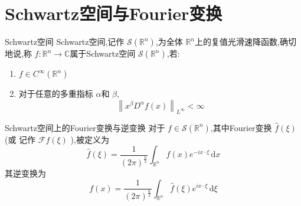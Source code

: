 \documentclass[../../main.tex]{subfiles}
\begin{document}
\section{Schwartz空间与Fourier变换}
\begin{definition}{Schwartz空间}
    Schwartz空间,记作 \(  \mathcal{S}\left( \mathbb{R} ^{n} \right)   \),为全体 \(  \mathbb{R} ^{n}  \)上的复值光滑速降函数,确切地说,称 \(  f:\mathbb{R} ^{n}\to \mathbb{C}   \)属于Schwartz空间 \(  \mathcal{S}\left( \mathbb{R} ^{n} \right)   \),若:
    \begin{enumerate}
        \item  \(  f \in C^{\infty}\left( \mathbb{R} ^{n} \right)   \)
        \item 对于任意的多重指标 \(  \alpha   \)和 \(  \beta   \), \[
        \left\| x^{\beta }D^{\alpha }f\left( x \right)  \right\|_{L^{\infty}}<\infty
        \]   
    \end{enumerate}
        
\end{definition}

\begin{definition}{Schwartz空间上的Fourier变换与逆变换}
    对于 \(  f \in \mathcal{S}\left( \mathbb{R} ^{n} \right)   \),其中Fourier变换 \(  \hat{f}\left(  \xi  \right)   \)(或 记作 \(  \mathcal{F}f\left(  \xi  \right)   \) ),被定义为 \[
    \hat{f}\left(  \xi  \right)=\frac{1 }{\left( 2\pi  \right)^{\frac{n }{2 } }  }  \int_{\mathbb{R} ^{n}}f\left( x \right)e^{- ix\cdot  \xi } \,\mathrm{d} x 
    \]  其逆变换为 \[
    f\left( x \right)= \frac{1 }{\left( 2\pi  \right)^{\frac{n }{2 } }  } \int_{\mathbb{R} ^{n}} \hat{f}\left(  \xi  \right)e^{ ix\cdot  \xi }\,\mathrm{d}  \xi   
    \]
\end{definition}
\end{document}
